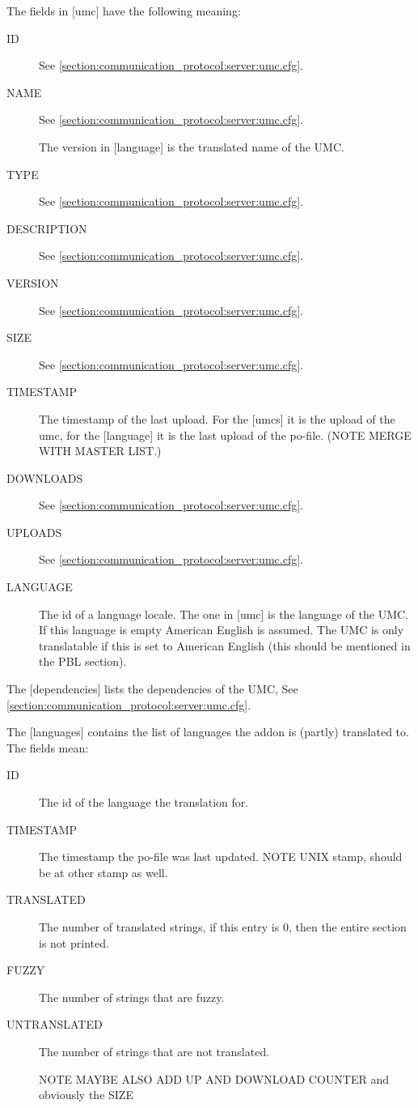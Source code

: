 The fields in [umc] have the following meaning:
\begin{description}
\item[ID]
	See \cref{section:communication_protocol:server:umc.cfg}.

\item[NAME]
	See \cref{section:communication_protocol:server:umc.cfg}.

	The version in [language] is the translated name of the UMC.

\item[TYPE]
	See \cref{section:communication_protocol:server:umc.cfg}.

\item[DESCRIPTION]
	See \cref{section:communication_protocol:server:umc.cfg}.

\item[VERSION]
	See \cref{section:communication_protocol:server:umc.cfg}.

\item[SIZE]
	See \cref{section:communication_protocol:server:umc.cfg}.

\item[TIMESTAMP]
	The timestamp of the last upload. For the [umcs] it is the upload
	of the umc, for the [language] it is the last upload of the
	po-file. (NOTE MERGE WITH MASTER LIST.)

\item[DOWNLOADS]
	See \cref{section:communication_protocol:server:umc.cfg}.

\item[UPLOADS]
	See \cref{section:communication_protocol:server:umc.cfg}.

\item[LANGUAGE]
	The id of a language locale. The one in [umc] is the language of
	the UMC. If this language is empty American English is assumed. The UMC
	is only translatable if this is set to American English (this should be
	mentioned in the PBL section).
\end{description}


The [dependencies] lists the dependencies of the UMC, See
\cref{section:communication_protocol:server:umc.cfg}.

The [languages] contains the list of languages the addon is (partly)
translated to. The fields mean:
\begin{description}
\item[ID]
	The id of the language the translation for.

\item[TIMESTAMP]
	The timestamp the po-file was last updated. NOTE UNIX stamp, should be
	at other stamp as well.

\item[TRANSLATED]
	The number of translated strings, if this entry is $0$, then the entire
	section is not printed.

\item[FUZZY]
	The number of strings that are fuzzy.

\item[UNTRANSLATED]
	The number of strings that are not translated.

NOTE MAYBE ALSO ADD UP AND DOWNLOAD COUNTER and obviously the SIZE
\end{description}

